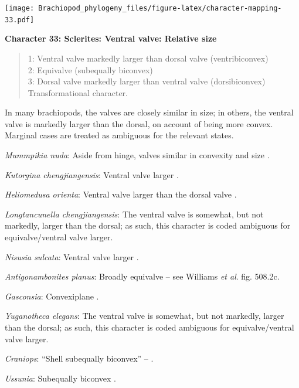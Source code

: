 \documentclass[]{book}
\theoremstyle{definition}
\theoremstyle{definition}
\theoremstyle{definition}
\theoremstyle{remark}
\begin{document}
\texttt{[image: Brachiopod\_phylogeny\_files/figure-latex/character-mapping-33.pdf]}

\textbf{Character 33: Sclerites: Ventral valve: Relative size}

\begin{quote}
1: Ventral valve markedly larger than dorsal valve (ventribiconvex)\\
2: Equivalve (subequally biconvex)\\
3: Dorsal valve markedly larger than ventral valve (dorsibiconvex)\\
Transformational character.
\end{quote}

In many brachiopods, the valves are closely similar in size; in others,
the ventral valve is markedly larger than the dorsal, on account of
being more convex. Marginal cases are treated as ambiguous for the
relevant states.

\emph{Mummpikia nuda}: Aside from hinge, valves similar in convexity and
size \citep{Balthasar2008iMummpikia}.

\emph{Kutorgina chengjiangensis}: Ventral valve larger \citep[see][fig.
125.]{Williams2000BrachiopodaLinguliformea}.

\emph{Heliomedusa orienta}: Ventral valve larger than the dorsal valve
\citep[p.~659]{Zhang2009Architectureand}.

\emph{Longtancunella chengjiangensis}: The ventral valve is somewhat,
but not markedly, larger than the dorsal; as such, this character is
coded ambiguous for equivalve/ventral valve larger.

\emph{Nisusia sulcata}: Ventral valve larger \citep[see][fig.
126.]{Williams2000BrachiopodaLinguliformea}.

\emph{Antigonambonites planus}: Broadly equivalve -- see Williams
\emph{et al}. \citeyearpar{Williams2000BrachiopodaLinguliformea} fig.
508.2c.

\emph{Gasconsia}: Convexiplane
\citep[p.~187]{Williams2000BrachiopodaLinguliformea}.

\emph{Yuganotheca elegans}: The ventral valve is somewhat, but not
markedly, larger than the dorsal; as such, this character is coded
ambiguous for equivalve/ventral valve larger.

\emph{Craniops}: ``Shell subequally biconvex'' --
\citet{Williams2000BrachiopodaLinguliformea}.

\emph{Ussunia}: Subequally biconvex
\citep[p.~192]{Williams2000BrachiopodaLinguliformea}.
\end{document}
